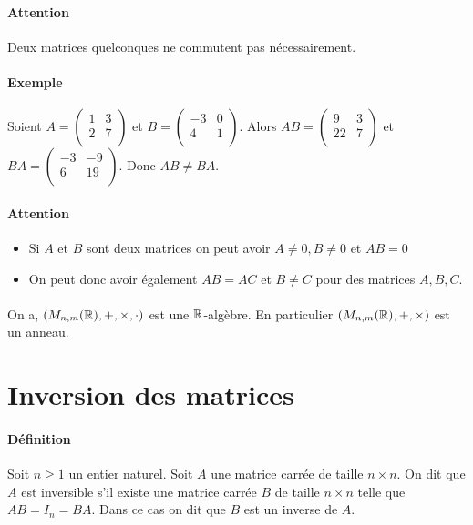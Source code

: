 \paragraph{Attention} Deux matrices quelconques ne commutent pas nécessairement.

\paragraph{Exemple} Soient $A=\begin{pmatrix}
  1 & 3 \\
 2 & 7 \\
\end{pmatrix}$ et $B=\begin{pmatrix}
  -3 & 0 \\
 4 & 1 \\
\end{pmatrix}$. Alors $AB=\begin{pmatrix}
  9 & 3 \\
 22 & 7 \\
\end{pmatrix}$ et $BA=\begin{pmatrix}
  -3 & -9 \\
 6 & 19 \\
\end{pmatrix}$. Donc $AB\neq BA$.

\paragraph{Attention}
\begin{itemize}
  \item Si $A$ et $B$ sont deux matrices on peut avoir $A \neq 0, B \neq 0$ et $AB = 0$
  \item On peut donc avoir également $AB = AC$ et $B \neq C$ pour des matrices $A, B, C$.
\end{itemize}

\paragraph{} On a, $(M_{n, m}(\mathbb{R}), +, \times, \cdot)$ est une $\mathbb{R}$-algèbre. En particulier $(M_{n, m}(\mathbb{R}), +, \times)$ est un anneau.

%
%
\section{Inversion des matrices}
%
%

\paragraph{Définition} Soit $n \geq 1$ un entier naturel. Soit $A$ une matrice carrée de taille $n \times n$. On dit que $A$ est inversible s'il existe une matrice carrée $B$ de taille $n \times n$ telle que $A B = I_n = B A$. Dans ce cas on dit que $B$ est un inverse de $A$.

